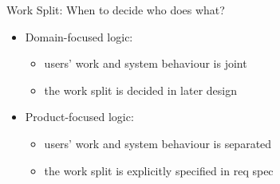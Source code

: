 \begin{Slide}{Work Split: When to decide who does what?}

\begin{itemize}
\item Domain-focused logic: 
\begin{itemize}
\item users' work and system behaviour is joint
\item the work split is decided in later design
\end{itemize}
\item Product-focused logic: 
\begin{itemize}
\item users' work and system behaviour is separated  
\item the work split is explicitly specified in req spec
 

\end{itemize}
\end{itemize}
\end{Slide}